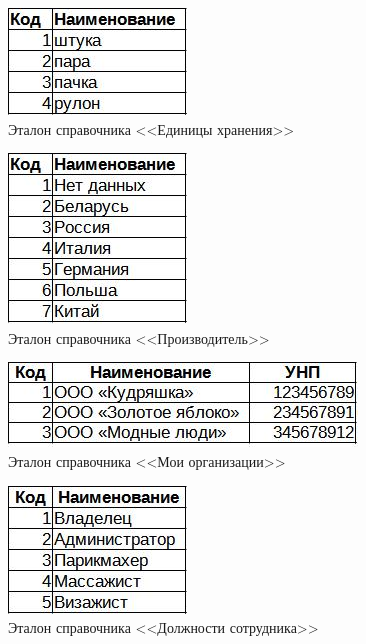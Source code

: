 \documentclass[12pt, a4paper, simple]{eskdtext}
\begin{document}
    \begin{figure}[!h]
        \centering
        \includegraphics[]
            {_docs/СП_ЕдХран_эталон.jpg}
        \caption{Эталон справочника <<Единицы хранения>>}
        \label{fig:CP_EdHran_etalon}
    \end{figure}
    
        \begin{figure}[!h]
            \centering
            \includegraphics[]
                {_docs/СП_Произв_эталон.jpg}
            \caption{Эталон справочника <<Производитель>>}
            \label{fig:CP_Proizv_etalon}
        \end{figure}

    \begin{figure}[!h]
        \centering
        \includegraphics[]
            {_docs/СП_МоиОрг_эталон.jpg}
        \caption{Эталон справочника <<Мои организации>>}
        \label{fig:CP_MoiOrg_etalon}
    \end{figure}

    \begin{figure}[!h]
        \centering
        \includegraphics[]
            {_docs/СП_ДолжнСотр_эталон.jpg}
        \caption{Эталон справочника <<Должности сотрудника>>}
        \label{fig:CP_DoljSotr_etalon}
    \end{figure}
\end{document}
